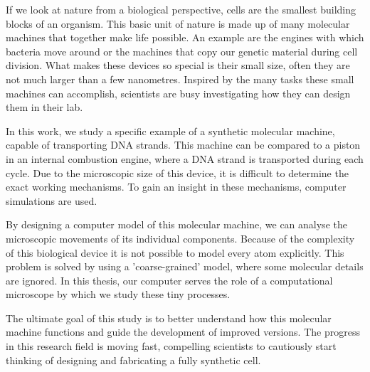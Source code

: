 If we look at nature from a biological perspective, cells are the smallest building
blocks of an organism. This basic unit of nature is made up of many molecular
machines that together make life possible. An example are the engines with which
bacteria move around or the machines that copy our genetic material during cell division.
What makes these devices so special is their small size, often they are not much
larger than a few nanometres. Inspired by the many tasks these small machines
can accomplish, scientists are busy investigating how they can design them in their lab.

In this work, we study a specific example of a synthetic molecular
machine, capable of transporting DNA strands. This machine can be compared to a piston
in an internal combustion engine, where a DNA strand is transported during each cycle.
Due to the microscopic size of this device, it is difficult to determine the exact
working mechanisms. To gain an insight in these mechanisms, computer simulations are
used.

By designing a computer model of this molecular machine, we can
analyse the microscopic movements of its individual components. Because of the complexity
of this biological device it is not possible to model every atom explicitly.
This problem is solved by using a 'coarse-grained' model, where
some molecular details are ignored. In this thesis, our computer serves the role of a
computational microscope by which we study these tiny processes.

The ultimate goal of this study is to better understand how this molecular machine
functions and guide the development of improved versions. The progress in this
research field is moving fast, compelling scientists to cautiously start thinking of
designing and fabricating a fully synthetic cell.

